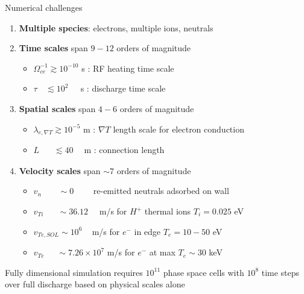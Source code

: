 \documentclass{beamer}
\begin{document}
\begin{frame}{Numerical challenges}
\begin{enumerate}
\item \textbf{Multiple species}: electrons, multiple ions, neutrals\\[0.5em]
\item \textbf{Time scales} span  $9 - 12$ orders of magnitude
\begin{itemize}
\item $\Omega_{ce}^{-1} \gtrsim 10^{-10}$ s : RF heating time scale \\[0.5em]
\item $\tau\phantom{_{ce}^{-1}} \lesssim 10^{2}\phantom{^{-0}}$ \,s : discharge time scale
\end{itemize}
\item \textbf{Spatial scales} span $4 - 6$ orders of magnitude
\begin{itemize}
\item $\lambda_{e,\nabla T} \gtrsim 10^{-5}$ m : $\nabla T$ length scale for electron conduction \\[0.5em]
\item $L\phantom{_{e,\nabla T}} \lesssim 40\phantom{^{-5}}$ m : connection length
\end{itemize}
\item \textbf{Velocity scales} span $\sim 7$ orders of magnitude
\begin{itemize}
\item $v_n\phantom{_i} \quad \,\,\,\,\sim 0$ \qquad \,\,\,\,\,\,\,\,\,\, re-emitted neutrals adsorbed on wall \\[0.5em]
\item $v_{Ti} \quad \,\,\,\,\sim 36.12$ \quad \,\,\,\, m/s for $H^+$ thermal ions $T_i = 0.025$ eV\\[0.5em]
\item $v_{Te,SOL} \sim 10^6$\qquad\,\,\,\,\,\,\,m/s for $e^-$ in edge $T_e = 10 - 50$ eV \\ [0.5em]  
\item $v_{Te} \quad \,\,\,\sim 7.26\times 10^{7}$ m/s for $e^-$ at max $T_e \sim 30$ keV \\[0.5em]
\end{itemize}
\end{enumerate}

Fully dimensional simulation requires $10^{11}$ phase space cells with $10^8$ time steps over full discharge based on physical scales alone

 

\end{frame}
\end{document}

